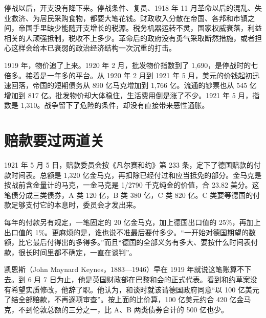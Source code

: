 停战以后，开支没有降下来。停战条件、复员、1918 年 11 月革命以后的混乱、失业救济、为居民采购食物，都要大笔花钱。财政收入分散在帝国、各邦和市镇之间，帝国手里缺少能随开支增长的税源。税务机器运转不灵，国家权威衰落，利益相关的人顽强抵制，税收不上多少。革命后的政府没有勇气采取断然措施，或者担心这样会给本已衰弱的政治经济结构一次沉重的打击\cite{bresciani1937}。

1919 年，物价追了上来。1920 年 2 月，批发物价指数到了 1,690，是停战时的七倍多\cite{sargent1982}。接着是一年多的平台。从 1920 年 2 月到 1921 年 5 月，美元的价钱起初迅速回落，帝国的短期债务从 890 亿马克增加到 1,766 亿。流通的钞票也从 545 亿增加到 817 亿。批发物价却大体稳住，生活费用倒是涨了不少\cite{bresciani1937}。1921 年 5 月，指数是 1,310\cite{sargent1982}。战争留下了危险的条件，却没有直接带来恶性通胀。


\section{赔款要过两道关}\label{sec:weimar-transfer}

1921 年 5 月 5 日，赔款委员会按《凡尔赛和约》第 233 条，定下了德国赔款的付款时间表。总额是 1,320 亿金马克，再扣除已经付过和应当抵免的部分\cite{london1921}。金马克是按战前含金量计的马克，一金马克是 1/2790 千克纯金的价值，合 23.82 美分\cite{renten1923,sargent1982}。这笔债分成三类债券，A 类 120 亿，B 类 380 亿，C 类 820 亿。C 类要等德国的付款足够支付它的本息时，委员会才发出来\cite{london1921}。

每年的付款另有规定，一笔固定的 20 亿金马克，加上德国出口值的 25\%，再加上出口值的 1\%\cite{london1921}。更麻烦的是，谁也说不准最后要付多少。“一开始对德国期望的数额，比它最后付得出的多得多。”而且“德国的全部义务有多大、要按什么时间表付款，很长时间里都不确定，一直在谈判”\cite{sargent1982}。

凯恩斯（John Maynard Keynes，1883—1946）早在 1919 年就说这笔账算不下去。到 6 月 7 日为止，他是英国财政部在巴黎和会的正式代表。看到和约草案没有希望实质修改，他辞了职\cite{keynes1919,keyneslife2026}。他认为，和谈时就该请德国政府同意“以 100 亿美元了结全部赔款，不再逐项审查”\cite{keynes1919}。按上面的比价算，100 亿美元约合 420 亿金马克，不到伦敦总额的三分之一，比 A、B 两类债券合计的 500 亿也少。


